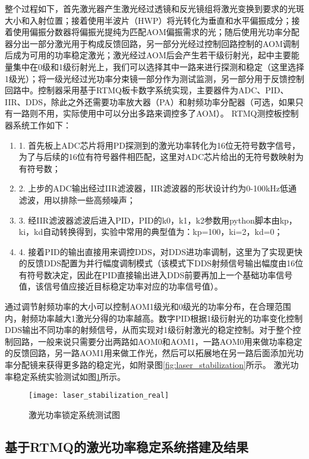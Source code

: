 整个过程如下，首先激光器产生激光经过透镜和反光镜组将激光变换到要求的光斑大小和入射位置；接着使用半波片（HWP）将光转化为垂直和水平偏振成分；接着使用偏振分数器将偏振光提纯为匹配AOM偏振需求的光；随后使用光功率分配器分出一部分激光用于构成反馈回路，另一部分光经过控制回路控制的AOM调制后成为可用的功率稳定激光；激光经过AOM后会产生若干级衍射光，起中主要能量集中在0级和1级衍射光上，我们可以选择其中一路来进行探测和稳定（这里选择1级光）；将一级光经过光功率分束镜一部分作为测试监测，另一部分用于反馈控制回路中。控制器采用基于RTMQ板卡数字系统实现，主要器件为ADC、PID、IIR、DDS，除此之外还需要功率放大器（PA）和射频功率分配器（可选，如果只有一路则不用，实际使用中可以分出多路来调控多了AOM）。
RTMQ测控板控制器系统工作如下：
\begin{enumerate}
    \item 1. 首先板上ADC芯片将用PD探测到的激光功率转化为16位无符号数字信号，为了与后续的16位有符号器件相匹配，这里对ADC芯片给出的无符号数映射为有符号数；
    \item 2. 上步的ADC输出经过IIR滤波器，IIR滤波器的形状设计约为0-100kHz低通滤波，用以排除一些高频噪声；
    \item 3. 经IIR滤波器滤波后进入PID，PID的k0，k1，k2参数用python脚本由kp，ki，kd自动转换得到，实验中常用的典型值为：kp=100，ki=2，kd=0；
    \item 4. 接着PID的输出直接用来调控DDS，对DDS进功率调制，这里为了实现更快的反馈DDS配置为并行幅度调制模式（该模式下DDS射频信号输出幅度由16位有符号数决定，因此在PID直接输出进入DDS前要再加上一个基础功率信号值，该信号值应接近目标稳定功率对应的功率信号值）。
\end{enumerate}

通过调节射频功率的大小可以控制AOM1级光和0级光的功率分布，在合理范围内，射频功率越大1激光分得的功率越高。数字PID根据1级衍射光的功率变化控制DDS输出不同功率的射频信号，从而实现对1级衍射激光的稳定控制。对于整个控制回路，一般来说只需要分出两路如AOM0和AOM1，一路AOM0用来做功率稳定的反馈回路，另一路AOM1用来做工作光，然后可以拓展地在另一路后面添加光功率分配镜来获得更多路的稳定光，如附录图\ref{fig:laser_stabilization}所示。
激光功率稳定系统实验测试如图\ref{fig:laser_stabilization_real}所示。

\begin{figure}
    \centering
    \caption[激光功率锁定系统测试图]{激光功率锁定系统测试图\label{fig:laser_stabilization_real}}
    \texttt{[image: laser\_stabilization\_real]}
\end{figure}


\subsection[基于RTMQ的激光功率稳定系统搭建及结果]{基于RTMQ的激光功率稳定系统搭建及结果}

